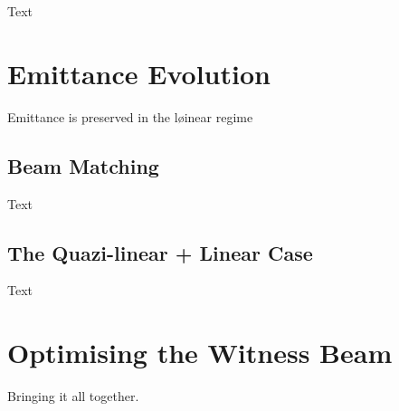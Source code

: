 Text

\section{Emittance Evolution}
\label{Sim:Emitt}

Emittance is preserved in the løinear regime

\subsection{Beam Matching}
\label{Sim:Match}

Text

\subsection{The Quazi-linear + Linear Case}
\label{Sim:QLinLin}

Text

\section{Optimising the Witness Beam}
\label{Sim:Opt}

Bringing it all together.


